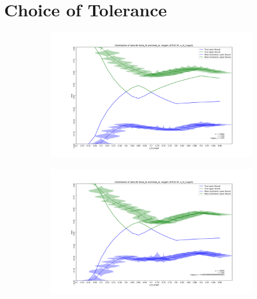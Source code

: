 \documentclass{article}
\begin{document}
\printbibliography

\appendix
\renewcommand\thefigure{\thesection.\arabic{figure}} 

\setcounter{table}{0}
\renewcommand{\thetable}{A\arabic{table}}

\clearpage
\newpage

\section{Choice of Tolerance}

\begin{figure}[h!]
    \caption{Simulation Results by Choice of $\kappa_n$ \label{app_fig:tolerances}}
     \centering

     \begin{subfigure}[b]{0.49\textwidth}
         \centering
          \includegraphics[width=\textwidth]{graph/simulation_sharp_bounds_10000_500_0.01}
     \end{subfigure}
    \hfill
     \begin{subfigure}[b]{0.49\textwidth}
         \centering
          \includegraphics[width=\textwidth]{graph/simulation_sharp_bounds_10000_500_0.00030000000000000003.png}
        \end{subfigure}


\end{figure}
\end{document}
